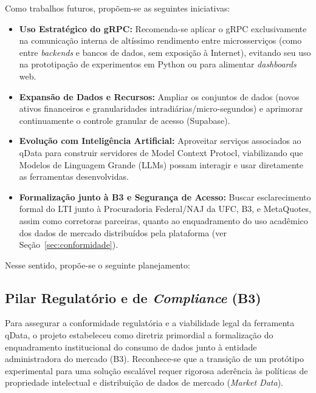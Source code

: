 Como trabalhos futuros, propõem-se as seguintes iniciativas:
\begin{itemize}
    \item \textbf{Uso Estratégico do gRPC:} Recomenda-se aplicar o gRPC exclusivamente na comunicação interna de altíssimo rendimento entre microsserviços (como entre \textit{backends} e bancos de dados, sem exposição à Internet), evitando seu uso na prototipação de experimentos em Python ou para alimentar \textit{dashboards} web.
    \item \textbf{Expansão de Dados e Recursos:} Ampliar os conjuntos de dados (novos ativos financeiros e granularidades intradiárias/micro-segundos) e aprimorar continuamente o controle granular de acesso (Supabase).
    \item \textbf{Evolução com Inteligência Artificial:} Aproveitar serviços associados ao qData para construir servidores de Model Context Protocl, viabilizando que Modelos de Linguagem Grande (LLMs) possam interagir e usar diretamente as ferramentas desenvolvidas.
    \item \textbf{Formalização junto à B3 e Segurança de Acesso:} Buscar esclarecimento formal do LTI junto à Procuradoria Federal/NAJ da UFC, B3, e MetaQuotes, assim como  corretoras parceiras, quanto ao enquadramento do uso acadêmico dos dados de mercado distribuídos pela plataforma (ver Seção~\ref{sec:conformidade}).
\end{itemize}

Nesse sentido, propõe-se o seguinte planejamento:

\subsection{Pilar Regulatório e de \textit{Compliance} (B3)}
Para assegurar a conformidade regulatória e a viabilidade legal da ferramenta qData, o projeto estabeleceu como diretriz primordial a formalização do enquadramento institucional do consumo de dados junto à entidade administradora do mercado (B3). Reconhece-se que a transição de um protótipo experimental para uma solução escalável requer rigorosa aderência às políticas de propriedade intelectual e distribuição de dados de mercado (\textit{Market Data}).

